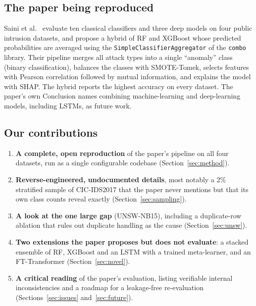 \documentclass[11pt,a4paper]{article}
\begin{document}
\subsection{The paper being reproduced}
Saini et al.\ \cite{saini2023} evaluate ten classical classifiers and three deep models on four public intrusion
datasets, and propose a hybrid of RF and XGBoost whose predicted probabilities are averaged using the
\texttt{SimpleClassifierAggregator} of the \texttt{combo} library. Their pipeline merges all attack types into a single
``anomaly'' class (binary classification), balances the classes with SMOTE-Tomek, selects features with Pearson
correlation followed by mutual information, and explains the model with SHAP. The hybrid reports the highest
accuracy on every dataset. The paper's own Conclusion names combining machine-learning and deep-learning models,
including LSTMs, as future work.

\subsection{Our contributions}
\begin{enumerate}
  \item \textbf{A complete, open reproduction} of the paper's pipeline on all four datasets, run as a single
        configurable codebase (Section~\ref{sec:method}).
  \item \textbf{Reverse-engineered, undocumented details}, most notably a 2\% stratified sample of CIC-IDS2017 that
        the paper never mentions but that its own class counts reveal exactly (Section~\ref{sec:sampling}).
  \item \textbf{A look at the one large gap} (UNSW-NB15), including a duplicate-row ablation that rules out
        duplicate handling as the cause (Section~\ref{sec:unsw}).
  \item \textbf{Two extensions the paper proposes but does not evaluate}: a stacked ensemble of RF, XGBoost and an LSTM
        with a trained meta-learner, and an FT-Transformer (Section~\ref{sec:novel}).
  \item \textbf{A critical reading} of the paper's evaluation, listing verifiable internal inconsistencies and a
        roadmap for a leakage-free re-evaluation (Sections~\ref{sec:issues} and~\ref{sec:future}).
\end{enumerate}

\end{document}
